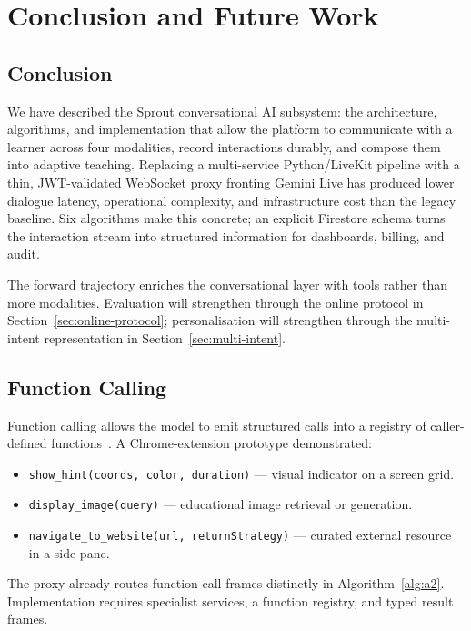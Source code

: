 \chapter{Conclusion and Future Work}
\label{ch:conclusion}

\section{Conclusion}
\label{sec:conclusion}

We have described the Sprout conversational AI subsystem: the architecture, algorithms, and implementation that allow the platform to communicate with a learner across four modalities, record interactions durably, and compose them into adaptive teaching. Replacing a multi-service Python/LiveKit pipeline with a thin, JWT-validated WebSocket proxy fronting Gemini Live has produced lower dialogue latency, operational complexity, and infrastructure cost than the legacy baseline. Six algorithms make this concrete; an explicit Firestore schema turns the interaction stream into structured information for dashboards, billing, and audit.

The forward trajectory enriches the conversational layer with tools rather than more modalities. Evaluation will strengthen through the online protocol in Section~\ref{sec:online-protocol}; personalisation will strengthen through the multi-intent representation in Section~\ref{sec:multi-intent}.

\section{Function Calling}
\label{sec:function-calling}

Function calling allows the model to emit structured calls into a registry of caller-defined functions~\cite{sprout2026function}. A Chrome-extension prototype demonstrated:
\begin{itemize}
    \item \texttt{show\_hint(coords, color, duration)} --- visual indicator on a screen grid.
    \item \texttt{display\_image(query)} --- educational image retrieval or generation.
    \item \texttt{navigate\_to\_website(url, returnStrategy)} --- curated external resource in a side pane.
\end{itemize}

The proxy already routes function-call frames distinctly in Algorithm~\ref{alg:a2}. Implementation requires specialist services, a function registry, and typed result frames.

